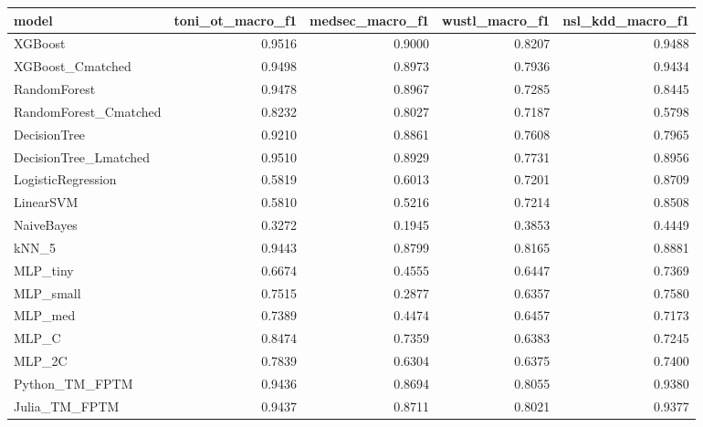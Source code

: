 \begin{tabular}{lrrrr}
\toprule
model & toni\_ot\_macro\_f1 & medsec\_macro\_f1 & wustl\_macro\_f1 & nsl\_kdd\_macro\_f1 \\
\midrule
XGBoost & 0.9516 & 0.9000 & 0.8207 & 0.9488 \\
XGBoost\_Cmatched & 0.9498 & 0.8973 & 0.7936 & 0.9434 \\
RandomForest & 0.9478 & 0.8967 & 0.7285 & 0.8445 \\
RandomForest\_Cmatched & 0.8232 & 0.8027 & 0.7187 & 0.5798 \\
DecisionTree & 0.9210 & 0.8861 & 0.7608 & 0.7965 \\
DecisionTree\_Lmatched & 0.9510 & 0.8929 & 0.7731 & 0.8956 \\
LogisticRegression & 0.5819 & 0.6013 & 0.7201 & 0.8709 \\
LinearSVM & 0.5810 & 0.5216 & 0.7214 & 0.8508 \\
NaiveBayes & 0.3272 & 0.1945 & 0.3853 & 0.4449 \\
kNN\_5 & 0.9443 & 0.8799 & 0.8165 & 0.8881 \\
MLP\_tiny & 0.6674 & 0.4555 & 0.6447 & 0.7369 \\
MLP\_small & 0.7515 & 0.2877 & 0.6357 & 0.7580 \\
MLP\_med & 0.7389 & 0.4474 & 0.6457 & 0.7173 \\
MLP\_C & 0.8474 & 0.7359 & 0.6383 & 0.7245 \\
MLP\_2C & 0.7839 & 0.6304 & 0.6375 & 0.7400 \\
Python\_TM\_FPTM & 0.9436 & 0.8694 & 0.8055 & 0.9380 \\
Julia\_TM\_FPTM & 0.9437 & 0.8711 & 0.8021 & 0.9377 \\
\bottomrule
\end{tabular}
